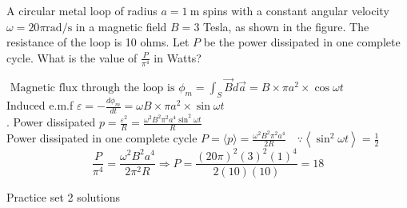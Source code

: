\begin{enumerate}
\begin{answer}
\end{answer}
\begin{minipage}{\textwidth}
	\item A circular metal loop of radius $a=1 \mathrm{~m}$ spins with a constant angular velocity $\omega=20 \pi \mathrm{rad} / \mathrm{s}$ in a magnetic field $B=3$ Tesla, as shown in the figure. The resistance of the loop is 10 ohms. Let $P$ be the power dissipated in one complete cycle. What is the value of $\frac{P}{\pi^{4}}$ in Watts?
\end{minipage}
\begin{answer}
	$\text { Magnetic flux through the loop is } \phi_{m}=\int_{S} \vec{B} d \vec{a}=B \times \pi a^{2} \times \cos \omega t$\\
	Induced e.m.f $\varepsilon=-\frac{d \phi_{m}}{d t}=\omega B \times \pi a^{2} \times \sin \omega t$\\.
	Power dissipated $p=\frac{\varepsilon^{2}}{R}=\frac{\omega^{2} B^{2} \pi^{2} a^{4} \sin ^{2} \omega t}{R}$\\
	Power dissipated in one complete cycle $P=\langle p\rangle=\frac{\omega^{2} B^{2} \pi^{2} a^{4}}{2 R} \quad \because\left\langle\sin ^{2} \omega t\right\rangle=\frac{1}{2}$
	$$
	\frac{P}{\pi^{4}}=\frac{\omega^{2} B^{2} a^{4}}{2 \pi^{2} R} \Rightarrow P=\frac{(20 \pi)^{2}(3)^{2}(1)^{4}}{2(10)(10)}=18
	$$
\end{answer}
\end{enumerate}
\newpage
\begin{abox}
	Practice set 2 solutions
	\end{abox}
